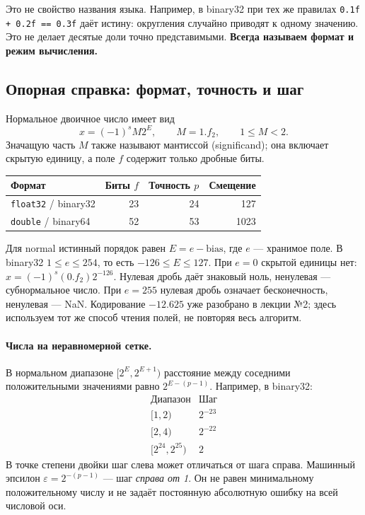 Это не свойство названия языка. Например, в binary32 при тех же правилах
\texttt{0.1f + 0.2f == 0.3f} даёт истину: округления случайно приводят
к одному значению. Это не делает десятые доли точно представимыми.
\textbf{Всегда называем формат и режим вычисления.}

\subsection{Опорная справка: формат, точность и шаг}
Нормальное двоичное число имеет вид
\[
 x=(-1)^s M2^E,\qquad M=1.f_2,\qquad 1\le M<2.
\]
Значащую часть $M$ также называют мантиссой (significand); она включает
скрытую единицу, а поле $f$ содержит только дробные биты.

\begin{center}
\begin{tabular}{|l|r|r|r|}
\hline
Формат & Биты $f$ & Точность $p$ & Смещение \\
\hline
\texttt{float32} / binary32 & 23 & 24 & 127 \\
\texttt{double} / binary64 & 52 & 53 & 1023 \\
\hline
\end{tabular}
\end{center}
Для normal истинный порядок равен $E=e-\mathrm{bias}$, где $e$ ---
хранимое поле. В binary32 $1\le e\le254$, то есть $-126\le E\le127$.
При $e=0$ скрытой единицы нет: $x=(-1)^s(0.f_2)2^{-126}$.
Нулевая дробь даёт знаковый ноль, ненулевая --- субнормальное число.
При $e=255$ нулевая дробь означает бесконечность, ненулевая --- NaN.
Кодирование $-12.625$ уже разобрано в лекции №2; здесь используем
тот же способ чтения полей, не повторяя весь алгоритм.

\paragraph{Числа на неравномерной сетке.}
В нормальном диапазоне $[2^E,2^{E+1})$ расстояние между соседними
положительными значениями равно $2^{E-(p-1)}$. Например, в binary32:
\[
\begin{array}{c|c}
\text{Диапазон} & \text{Шаг} \\
\hline
{[1,2)} & 2^{-23} \\
{[2,4)} & 2^{-22} \\
{[2^{24},2^{25})} & 2
\end{array}
\]
В точке степени двойки шаг слева может отличаться от шага справа.
Машинный эпсилон $\varepsilon=2^{-(p-1)}$ --- шаг \emph{справа от 1}.
Он не равен минимальному положительному числу и не задаёт постоянную
абсолютную ошибку на всей числовой оси.

